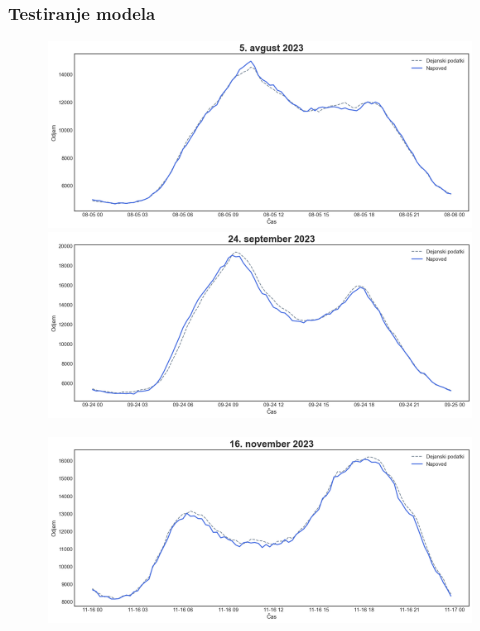 \documentclass[14p, hyperref={unicode}]{beamer}
\begin{document}
\begin{frame}
    
    \frametitle{Testiranje modela} 

    \begin{figure}[!ht]
        \centering
        \begin{minipage}[c]{0.48\linewidth}
            \includegraphics[width=\linewidth]{napoved_1.png}
        \end{minipage}
        \hfill
        \begin{minipage}[c]{0.48\linewidth}
            \includegraphics[width=\linewidth]{napoved_2.png}
        \end{minipage}
    \end{figure}
    \begin{figure}[!ht]
        \centering
        \begin{minipage}[c]{0.48\linewidth}
            \includegraphics[width=\linewidth]{napoved_3.png}

\end{minipage}
\end{figure}
\end{frame}
\end{document}
